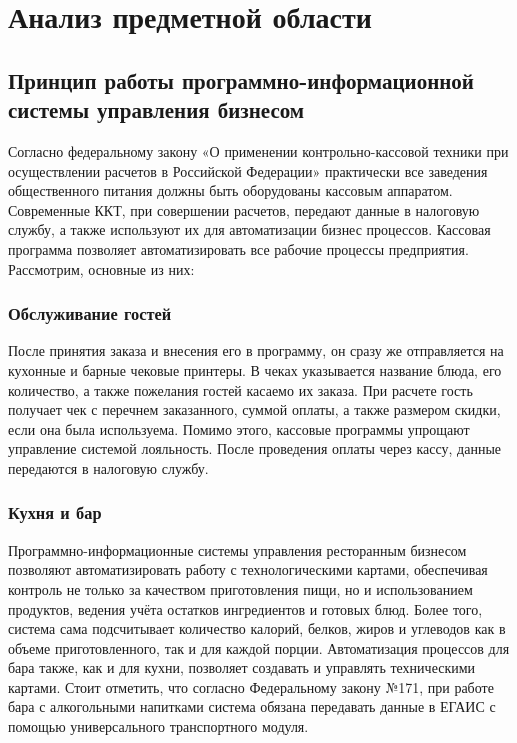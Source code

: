 \section{Анализ предметной области}
\subsection{Принцип работы программно-информационной системы управления бизнесом}

Согласно федеральному закону «О применении контрольно-кассовой техники при осуществлении расчетов в Российской Федерации» практически все заведения общественного питания должны быть оборудованы кассовым аппаратом. Современные ККТ, при совершении расчетов, передают данные в налоговую службу, а также используют их для автоматизации бизнес процессов. Кассовая программа позволяет автоматизировать все рабочие процессы предприятия. Рассмотрим, основные из них:

\subsubsection{Обслуживание гостей}
После принятия заказа и внесения его в программу, он сразу же отправляется на кухонные и барные чековые принтеры. В чеках указывается название блюда, его количество, а также пожелания гостей касаемо их заказа. При расчете гость получает чек с перечнем заказанного, суммой оплаты, а также размером скидки, если она была используема. Помимо этого, кассовые программы упрощают управление системой лояльность. После проведения оплаты через кассу, данные передаются в налоговую службу.

\subsubsection{Кухня и бар}
Программно-информационные системы управления ресторанным бизнесом позволяют автоматизировать работу с технологическими картами, обеспечивая контроль не только за качеством приготовления пищи, но и использованием продуктов, ведения учёта остатков ингредиентов и готовых блюд. Более того, система сама подсчитывает количество калорий, белков, жиров и углеводов как в объеме приготовленного, так и для каждой порции.
Автоматизация процессов для бара также, как и для кухни, позволяет создавать и управлять техническими картами. Стоит отметить, что согласно Федеральному закону №171, при работе бара с алкогольными напитками система обязана передавать данные в ЕГАИС с помощью универсального транспортного модуля.


